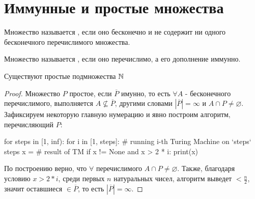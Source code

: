 \section{Иммунные и простые множества}

\begin{defn}
    Множество называется , если оно бесконечно и не содержит ни одного бесконечного перечислимого множества.
\end{defn}

\begin{defn}
    Множество называется , если оно перечислимо, а его дополнение иммунно.
\end{defn}

\begin{thm}
    Существуют простые подмножества $ \mathbb{N}$
\end{thm}
\begin{proof}
    Множество $ P$ простое, если $ \overline P$ имунно, то есть $ \forall A$ - бесконечного перечислимого, выполняется $ A \nsubseteq \overline P$, другими словами $ |\overline P| = \infty$ и $ A \cap P \neq \varnothing$. \\
    Зафиксируем некоторую главную нумерацию и явно построим алгоритм, перечисляющий $ P$:
    
    \begin{python}
for steps in [1, inf):
    for i in [1, steps]:
        # running i-th Turing Machine on `steps` steps
        x = # result of TM
        if x != None and x > 2 * i:
            print(x)
\end{python}

  \par По построению верно, что $ \forall$ перечислимого $ A \cap P \neq \varnothing$. Также, благодаря условию $ x > 2 * i$, среди первых $ n$ натуральных чисел, алгоритм выведет $ < \frac{n}{2}$, значит оставшиеся $ \in \overline P$, то есть $ |\overline P| = \infty$.
\end{proof}

